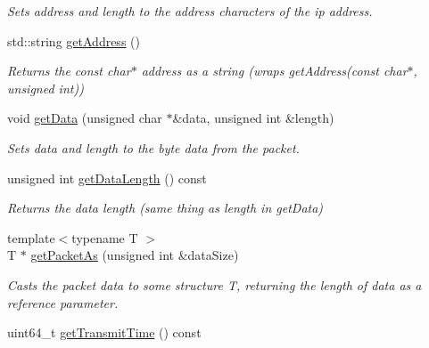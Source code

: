 \begin{DoxyCompactItemize}
\begin{DoxyCompactList}\small\item\em Sets address and length to the address characters of the ip address. \end{DoxyCompactList}\item 
\hypertarget{class_champ_net_1_1_packet_a98b70a972a4a956e94f7203bc2f77402}{std\-::string \hyperlink{class_champ_net_1_1_packet_a98b70a972a4a956e94f7203bc2f77402}{get\-Address} ()}\label{class_champ_net_1_1_packet_a98b70a972a4a956e94f7203bc2f77402}

\begin{DoxyCompactList}\small\item\em Returns the const char$\ast$ address as a string (wraps get\-Address(const char$\ast$, unsigned int)) \end{DoxyCompactList}\item 
\hypertarget{class_champ_net_1_1_packet_a01e9211c5d6a0080d035ddf969a4efa5}{void \hyperlink{class_champ_net_1_1_packet_a01e9211c5d6a0080d035ddf969a4efa5}{get\-Data} (unsigned char $\ast$\&data, unsigned int \&length)}\label{class_champ_net_1_1_packet_a01e9211c5d6a0080d035ddf969a4efa5}

\begin{DoxyCompactList}\small\item\em Sets data and length to the byte data from the packet. \end{DoxyCompactList}\item 
\hypertarget{class_champ_net_1_1_packet_a0a8b68fc76f6bfe512244acfef247627}{unsigned int \hyperlink{class_champ_net_1_1_packet_a0a8b68fc76f6bfe512244acfef247627}{get\-Data\-Length} () const }\label{class_champ_net_1_1_packet_a0a8b68fc76f6bfe512244acfef247627}

\begin{DoxyCompactList}\small\item\em Returns the data length (same thing as length in get\-Data) \end{DoxyCompactList}\item 
\hypertarget{class_champ_net_1_1_packet_ad336c6b2ff59a0dff1bf7d70f1da9340}{{\footnotesize template$<$typename T $>$ }\\T $\ast$ \hyperlink{class_champ_net_1_1_packet_ad336c6b2ff59a0dff1bf7d70f1da9340}{get\-Packet\-As} (unsigned int \&data\-Size)}\label{class_champ_net_1_1_packet_ad336c6b2ff59a0dff1bf7d70f1da9340}

\begin{DoxyCompactList}\small\item\em Casts the packet data to some structure T, returning the length of data as a reference parameter. \end{DoxyCompactList}\item 
\hypertarget{class_champ_net_1_1_packet_a41aeb09357d49b53ae2bdb7829a2c7cb}{uint64\-\_\-t \hyperlink{class_champ_net_1_1_packet_a41aeb09357d49b53ae2bdb7829a2c7cb}{get\-Transmit\-Time} () const }\label{class_champ_net_1_1_packet_a41aeb09357d49b53ae2bdb7829a2c7cb}


\end{DoxyCompactItemize}
